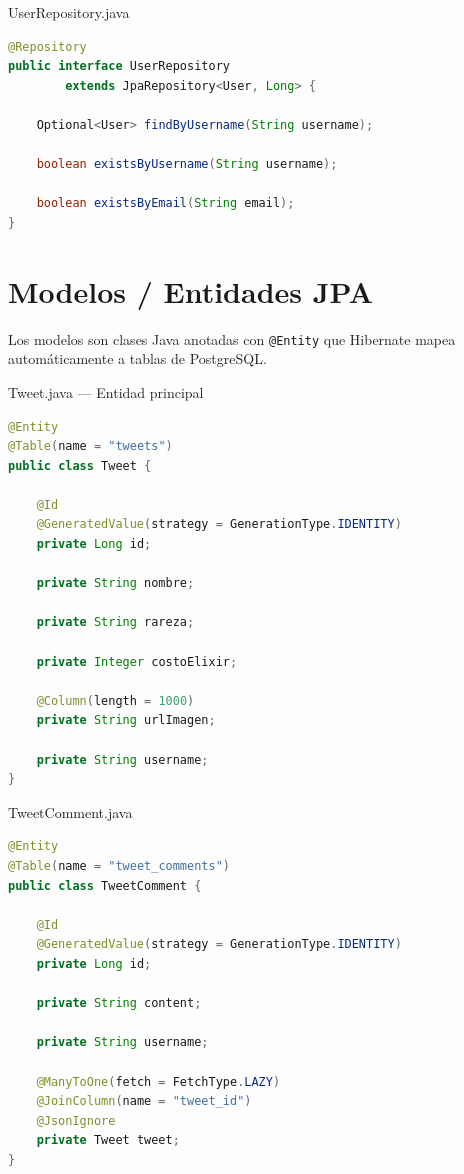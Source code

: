 \documentclass[12pt,a4paper]{article}
\begin{document}
\begin{filebox}{UserRepository.java}
\begin{lstlisting}[language=Java]
@Repository
public interface UserRepository
        extends JpaRepository<User, Long> {

    Optional<User> findByUsername(String username);

    boolean existsByUsername(String username);

    boolean existsByEmail(String email);
}
\end{lstlisting}
\end{filebox}

\section{Modelos / Entidades JPA}

Los modelos son clases Java anotadas con \texttt{@Entity} que Hibernate
mapea automáticamente a tablas de PostgreSQL.

\begin{filebox}{Tweet.java --- Entidad principal}
\begin{lstlisting}[language=Java]
@Entity
@Table(name = "tweets")
public class Tweet {

    @Id
    @GeneratedValue(strategy = GenerationType.IDENTITY)
    private Long id;

    private String nombre;

    private String rareza;

    private Integer costoElixir;

    @Column(length = 1000)
    private String urlImagen;

    private String username;
}
\end{lstlisting}
\end{filebox}

\begin{filebox}{TweetComment.java}
\begin{lstlisting}[language=Java]
@Entity
@Table(name = "tweet_comments")
public class TweetComment {

    @Id
    @GeneratedValue(strategy = GenerationType.IDENTITY)
    private Long id;

    private String content;

    private String username;

    @ManyToOne(fetch = FetchType.LAZY)
    @JoinColumn(name = "tweet_id")
    @JsonIgnore
    private Tweet tweet;
}
\end{lstlisting}
\end{filebox}
\end{document}

